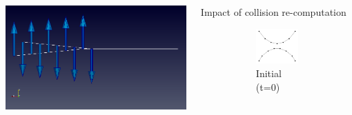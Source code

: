 \documentclass[aspectratio=1610,t,10pt]{beamer}
\begin{document}
\begin{frame}
\begin{columns}[t]
\begin{column}{.48\textwidth}
\begin{minipage}{0.49\linewidth}
            
            \includegraphics[width=\linewidth]{img/expected} 
        \end{minipage}			
    \end{column}
    \begin{column}{.48\textwidth}
        \begin{block}{Impact of collision re-computation}
            \centering		
            \begin{figure}
                \centering
                \begin{subfigure}[t]{0.48\textwidth}
                    \centering
                    \includegraphics[width=0.8\linewidth]{img/res-collision/disloc-plot-1}
                    \caption{Initial (t=0)}
                \end{subfigure}
                \begin{subfigure}[t]{0.48\textwidth}
                    \centering

\end{subfigure}
\end{figure}
\end{block}
\end{column}
\end{columns}
\end{frame}
\end{document}
